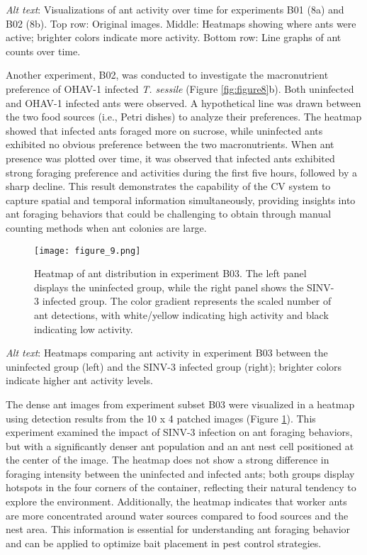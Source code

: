 \textit{Alt text}: Visualizations of ant activity over time for experiments B01 (8a) and B02 (8b). Top row: Original images. Middle: Heatmaps showing where ants were active; brighter colors indicate more activity. Bottom row: Line graphs of ant counts over time.

Another experiment, B02, was conducted to investigate the macronutrient preference of OHAV-1 infected \emph{T. sessile} (Figure \ref{fig:figure8}b). Both uninfected and OHAV-1 infected ants were observed. A hypothetical line was drawn between the two food sources (i.e., Petri dishes) to analyze their preferences. The heatmap showed that infected ants foraged more on sucrose, while uninfected ants exhibited no obvious preference between the two macronutrients. When ant presence was plotted over time, it was observed that infected ants exhibited strong foraging preference and activities during the first five hours, followed by a sharp decline. This result demonstrates the capability of the CV system to capture spatial and temporal information simultaneously, providing insights into ant foraging behaviors that could be challenging to obtain through manual counting methods when ant colonies are large.

\begin{figure}[H]
    \centering
    \texttt{[image: figure\_9.png]}
    \caption{Heatmap of ant distribution in experiment B03. The left panel displays the uninfected group, while the right panel shows the SINV-3 infected group. The color gradient represents the scaled number of ant detections, with white/yellow indicating high activity and black indicating low activity.}
    \label{fig:figure9}
\end{figure}

\textit{Alt text}: Heatmaps comparing ant activity in experiment B03 between the uninfected group (left) and the SINV-3 infected group (right); brighter colors indicate higher ant activity levels.

The dense ant images from experiment subset B03 were visualized in a heatmap using detection results from the 10 x 4 patched images (Figure \ref{fig:figure9}). This experiment examined the impact of SINV-3 infection on ant foraging behaviors, but with a significantly denser ant population and an ant nest cell positioned at the center of the image. The heatmap does not show a strong difference in foraging intensity between the uninfected and infected ants; both groups display hotspots in the four corners of the container, reflecting their natural tendency to explore the environment. Additionally, the heatmap indicates that worker ants are more concentrated around water sources compared to food sources and the nest area. This information is essential for understanding ant foraging behavior and can be applied to optimize bait placement in pest control strategies.

